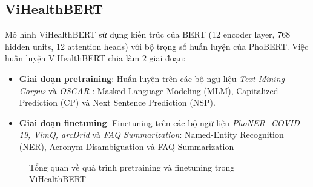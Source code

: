 \subsection{ViHealthBERT}
Mô hình ViHealthBERT sử dụng kiến trúc của BERT (12 encoder layer, 768 hidden units, 12 attention heads) với bộ trọng số huấn luyện của PhoBERT. Việc huấn luyện ViHealthBERT chia làm 2 giai đoạn:
\begin{itemize}
\item \textbf{Giai đoạn pretraining}: Huấn luyện trên các bộ ngữ liệu \textit{Text Mining Corpus} và \textit{OSCAR} : Masked Language Modeling (MLM), Capitalized Prediction (CP) và Next Sentence Prediction (NSP).
\item \textbf{Giai đoạn finetuning}: Finetuning trên các bộ ngữ liệu \textit{PhoNER\_COVID-19, VimQ, arcDrid} và \textit{FAQ Summarization}: Named-Entity Recognition (NER), Acronym Disambiguation và FAQ Summarization
\end{itemize}

\begin{figure}
\begin{center}
\caption{Tổng quan về quá trình pretraining và finetuning trong ViHealthBERT\cite{minh-EtAl:2022:LREC}}
\end{center}
\end{figure}